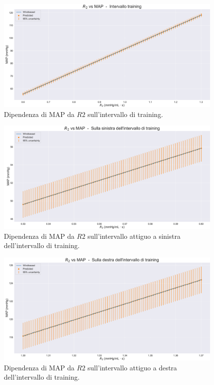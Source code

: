 \vspace{1cm}

\begin{figure}[!htb]
    \centering
    \includegraphics[width=1\textwidth]{images/Training (risultati)/MAP/MAP - R2 - training.pdf}
    \caption{Dipendenza di MAP da $R2$ sull'intervallo di training.}
    \label{MAP - R2 - training}
\end{figure}

\begin{figure}
    \centering
    \includegraphics[width=1\textwidth]{images/Training (risultati)/MAP/MAP - R2 - sx.pdf}
    \caption{Dipendenza di MAP da $R2$ sull'intervallo attiguo a sinistra dell'intervallo di training.}
    \label{MAP - R2 - sx}
\end{figure}


\begin{figure}
    \centering
    \includegraphics[width=1\textwidth]{images/Training (risultati)/MAP/MAP - R2 - dx.pdf}
    \caption{Dipendenza di MAP da $R2$ sull'intervallo attiguo a destra dell'intervallo di training.}
    \label{MAP - R2 - dx}
\end{figure}







